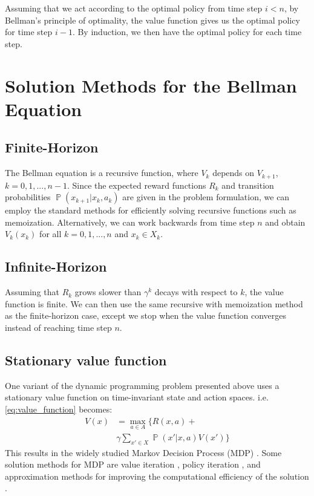 \documentclass[conference]{IEEEtran}
\DeclareMathOperator*{\Prob}{\mathbb{P}}
\begin{document}
Assuming that we act according to the optimal policy from time step $i < n$, by Bellman's principle of optimality, the value function gives us the optimal policy for time step $i - 1$. By induction, we then have the optimal policy for each time step.

\section{Solution Methods for the Bellman Equation}

\subsection{Finite-Horizon}

The Bellman equation is a recursive function, where $V_{k}$ depends on $V_{k+1}$,  $k=0,1,...,n-1$. Since the expected reward functions $R_k$ and transition probabilities $\Prob(x_{k+1}|x_k,a_k)$ are given in the problem formulation, we can employ the standard methods for efficiently solving recursive functions such as memoization. Alternatively, we can work backwards from time step $n$ and obtain $V_k(x_k)$ for all $k = 0,1,...,n$ and $x_k \in X_k$.

\subsection{Infinite-Horizon}

Assuming that $R_k$ grows slower than $\gamma^k$ decays with respect to $k$, the value function is finite. We can then use the same recursive with memoization method as the finite-horizon case, except we stop when the value function converges instead of reaching time step $n$.

\subsection{Stationary value function}

One variant of the dynamic programming problem presented above uses a stationary value function on time-invariant state and action spaces. i.e. \eqref{eq:value_function} becomes:
\begin{equation}
\begin{aligned}
V(x) &= \max_{a \in A} \{ R(x,a) + \\
         & \gamma\sum_{x' \in X} \Prob(x'|x,a) V(x') \}
\label{eq:stationary_value_function}
\end{aligned}
\end{equation}
This results in the widely studied Markov Decision Process (MDP) \cite{bellman1957markovian}. Some solution methods for MDP are value iteration \cite{bellman1957markovian}, policy iteration \cite{howard1960dynamic}, and approximation methods for improving the computational efficiency of the solution \cite{van1976set,puterman1978modified}.
\end{document}

